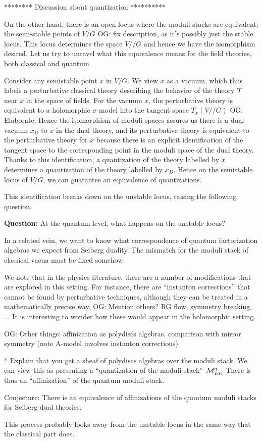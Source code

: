\documentclass[11pt]{amsart}
\def\owen#1{{\textcolor{violet!65!black}{OG: {#1}}}}
\begin{document}
******** Discussion about quantization **********


On the other hand, there is an open locus where the moduli stacks are equivalent:
the semi-stable points of $V/G$ \owen{fix description, as it's possibly just the stable locus}.
This locus determines the space $V//G$ and hence we have the isomorphism desired.
Let us try to unravel what this equivalence means for the field theories, both classical and quantum.

Consider any semistable point $x$ in $V/G$.
We view $x$ as a vacuum, which thus labels a perturbative classical theory describing the behavior of the theory $\mathcal T$ near $x$ in the space of fields. 
For the vacuum $x$, the perturbative theory is equivalent to a holomorphic $\sigma$-model into the tangent space $T_x (V//G)$ \owen{Elaborate}. 
Hence the isomorphism of moduli spaces assures us there is a dual vacuum $x_D$ to $x$ in the dual theory, and its perturbative theory is equivalent to the perturbative theory for $x$
because there is an explicit identification of the tangent space to the corresponding point in the moduli space of the dual theory.
Thanks to this identification, a quantization of the theory labelled by $x$ determines a quantization of the theory labelled by $x_D$.
Hence on the semistable locus of $V/G$, we can guarantee an equivalence of quantizations.

This identification breaks down on the unstable locus, raising the following question.

{\bf Question:}
At the quantum level, what happens on the unstable locus? 


In a related vein, we want to know what correspondence of quantum factorization algebras we expect from Seiberg duality. 
The mismatch for the moduli stack of classical vacua must be fixed somehow.

We note that in the physics literature, there are a number of modifications that are explored in this setting.
For instance, there are ``instanton corrections'' that cannot be found by perturbative techniques, although they can be treated in a mathematically precise way. 
\owen{Mention others? RG flow, symmetry breaking, ...}
It is interesting to wonder how these would appear in the holomorphic setting.

\owen{Other things: affinization as polydiscs algebras, comparison with mirror symmetry (note A-model involves instanton corrections)}



* Explain that you get a sheaf of polydiscs algebras over the moduli stack. We can view this as presenting a ``quantization of the moduli stack'' $\mathcal M_{vac}^{\rm q}$ There is thus an ``affinization'' of the quantum moduli stack.

Conjecture: There is an equivalence of affinizations of the quantum moduli stacks for Seiberg dual theories.

This process probably looks away from the unstable locus in the same way that the classical part does. 
\end{document}
